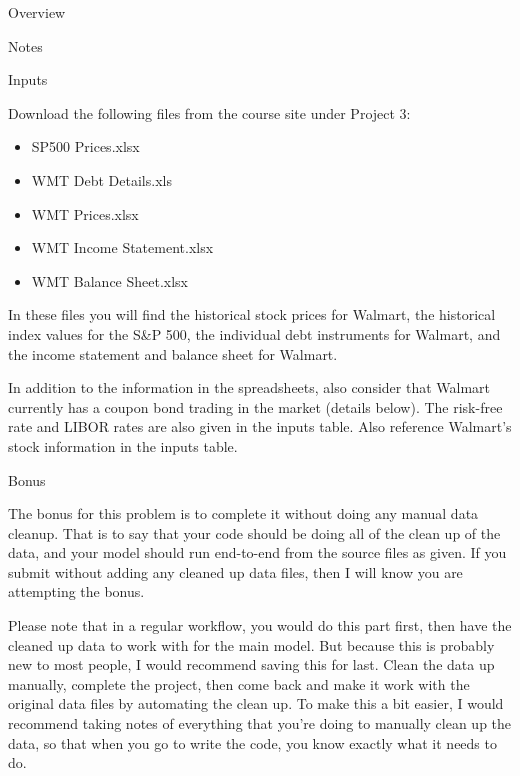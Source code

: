 \documentclass[]{article}
\begin{document}
\begin{section}{Overview}
\begin{subsection}{Notes}
\end{subsection}

\begin{subsection}{Inputs}


Download the following files from the course site under Project 3:
\begin{itemize}
\item SP500 Prices.xlsx
\item WMT Debt Details.xls
\item WMT Prices.xlsx
\item WMT Income Statement.xlsx
\item WMT Balance Sheet.xlsx
\end{itemize}

In these files you will find the historical stock prices for Walmart, the historical index values for the S\&P 500,
the individual debt instruments for Walmart, and the income statement and balance sheet for Walmart.

In addition to the information in the spreadsheets, also consider that Walmart currently has a
coupon bond trading in the market (details below). The risk-free rate
and LIBOR rates are also given in the inputs table.
Also reference Walmart's stock information in the inputs table.


\end{subsection}
\begin{subsection}{Bonus}

The bonus for this problem is to complete it without doing any manual data cleanup. That is to say that your code should
be doing all of the clean up of the data, and your model should run end-to-end from the source files as given. If you 
submit without adding any cleaned up data files, then I will know you are attempting the bonus.

Please note that in a regular workflow, you would do this part first, then have the cleaned up data to work with for the 
main model. But because this is probably new to most people, I would recommend saving this for last. Clean the data up 
manually, complete the project, then come back and make it work with the original data files by automating the
clean up. To make this a bit easier, I would recommend taking notes of everything that you're doing to manually 
clean up the data, so that when you go to write the code, you know exactly what it needs to do.


\end{subsection}
\end{section}
\end{document}
